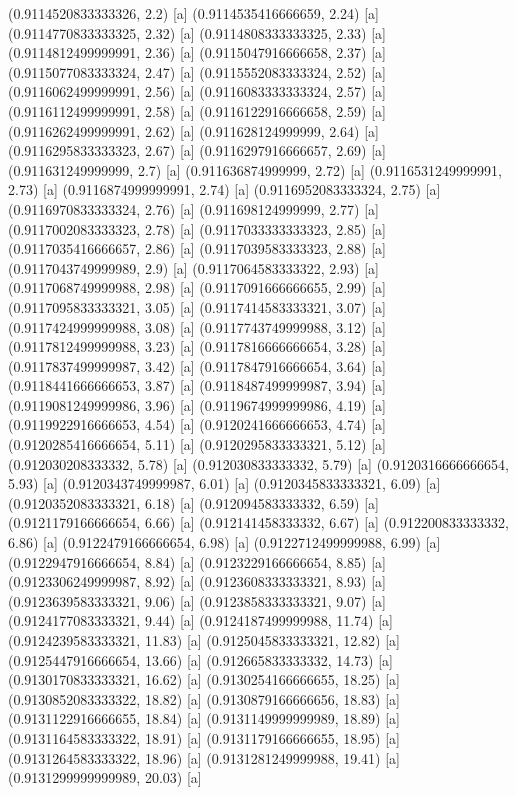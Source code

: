 {{{(0.9114520833333326, 2.2) [a] 
(0.9114535416666659, 2.24) [a] 
(0.9114770833333325, 2.32) [a] 
(0.9114808333333325, 2.33) [a] 
(0.9114812499999991, 2.36) [a] 
(0.9115047916666658, 2.37) [a] 
(0.9115077083333324, 2.47) [a] 
(0.9115552083333324, 2.52) [a] 
(0.9116062499999991, 2.56) [a] 
(0.9116083333333324, 2.57) [a] 
(0.9116112499999991, 2.58) [a] 
(0.9116122916666658, 2.59) [a] 
(0.9116262499999991, 2.62) [a] 
(0.911628124999999, 2.64) [a] 
(0.9116295833333323, 2.67) [a] 
(0.9116297916666657, 2.69) [a] 
(0.911631249999999, 2.7) [a] 
(0.911636874999999, 2.72) [a] 
(0.9116531249999991, 2.73) [a] 
(0.9116874999999991, 2.74) [a] 
(0.9116952083333324, 2.75) [a] 
(0.9116970833333324, 2.76) [a] 
(0.911698124999999, 2.77) [a] 
(0.9117002083333323, 2.78) [a] 
(0.9117033333333323, 2.85) [a] 
(0.9117035416666657, 2.86) [a] 
(0.9117039583333323, 2.88) [a] 
(0.9117043749999989, 2.9) [a] 
(0.9117064583333322, 2.93) [a] 
(0.9117068749999988, 2.98) [a] 
(0.9117091666666655, 2.99) [a] 
(0.9117095833333321, 3.05) [a] 
(0.9117414583333321, 3.07) [a] 
(0.9117424999999988, 3.08) [a] 
(0.9117743749999988, 3.12) [a] 
(0.9117812499999988, 3.23) [a] 
(0.9117816666666654, 3.28) [a] 
(0.9117837499999987, 3.42) [a] 
(0.9117847916666654, 3.64) [a] 
(0.9118441666666653, 3.87) [a] 
(0.9118487499999987, 3.94) [a] 
(0.9119081249999986, 3.96) [a] 
(0.9119674999999986, 4.19) [a] 
(0.9119922916666653, 4.54) [a] 
(0.9120241666666653, 4.74) [a] 
(0.9120285416666654, 5.11) [a] 
(0.9120295833333321, 5.12) [a] 
(0.912030208333332, 5.78) [a] 
(0.912030833333332, 5.79) [a] 
(0.9120316666666654, 5.93) [a] 
(0.9120343749999987, 6.01) [a] 
(0.9120345833333321, 6.09) [a] 
(0.9120352083333321, 6.18) [a] 
(0.912094583333332, 6.59) [a] 
(0.9121179166666654, 6.66) [a] 
(0.912141458333332, 6.67) [a] 
(0.912200833333332, 6.86) [a] 
(0.9122479166666654, 6.98) [a] 
(0.9122712499999988, 6.99) [a] 
(0.9122947916666654, 8.84) [a] 
(0.9123229166666654, 8.85) [a] 
(0.9123306249999987, 8.92) [a] 
(0.9123608333333321, 8.93) [a] 
(0.9123639583333321, 9.06) [a] 
(0.9123858333333321, 9.07) [a] 
(0.9124177083333321, 9.44) [a] 
(0.9124187499999988, 11.74) [a] 
(0.9124239583333321, 11.83) [a] 
(0.9125045833333321, 12.82) [a] 
(0.9125447916666654, 13.66) [a] 
(0.912665833333332, 14.73) [a] 
(0.9130170833333321, 16.62) [a] 
(0.9130254166666655, 18.25) [a] 
(0.9130852083333322, 18.82) [a] 
(0.9130879166666656, 18.83) [a] 
(0.9131122916666655, 18.84) [a] 
(0.9131149999999989, 18.89) [a] 
(0.9131164583333322, 18.91) [a] 
(0.9131179166666655, 18.95) [a] 
(0.9131264583333322, 18.96) [a] 
(0.9131281249999988, 19.41) [a] 
(0.9131299999999989, 20.03) [a] 
}}}

